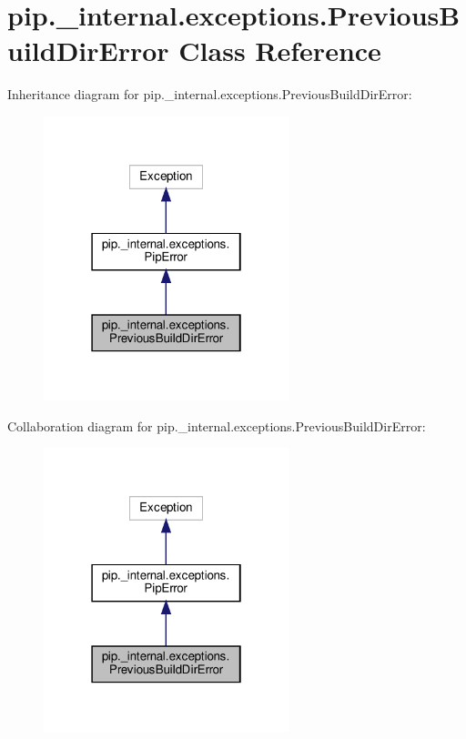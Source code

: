 \hypertarget{classpip_1_1__internal_1_1exceptions_1_1PreviousBuildDirError}{}\section{pip.\+\_\+internal.\+exceptions.\+Previous\+Build\+Dir\+Error Class Reference}
\label{classpip_1_1__internal_1_1exceptions_1_1PreviousBuildDirError}


Inheritance diagram for pip.\+\_\+internal.\+exceptions.\+Previous\+Build\+Dir\+Error\+:
\nopagebreak
\begin{figure}[H]
\begin{center}
\leavevmode
\includegraphics[width=202pt]{classpip_1_1__internal_1_1exceptions_1_1PreviousBuildDirError__inherit__graph}
\end{center}
\end{figure}


Collaboration diagram for pip.\+\_\+internal.\+exceptions.\+Previous\+Build\+Dir\+Error\+:
\nopagebreak
\begin{figure}[H]
\begin{center}
\leavevmode
\includegraphics[width=202pt]{classpip_1_1__internal_1_1exceptions_1_1PreviousBuildDirError__coll__graph}
\end{center}
\end{figure}


